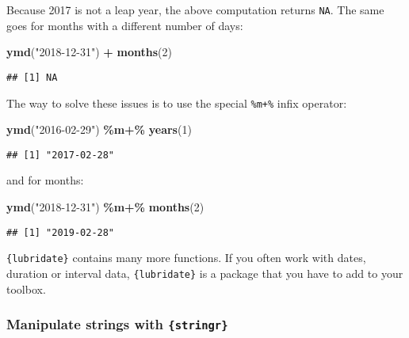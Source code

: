 \documentclass[
]{article}
\newenvironment{Shaded}{\begin{snugshade}}{\end{snugshade}}
\newcommand{\DecValTok}[1]{\textcolor[rgb]{0.00,0.00,0.81}{#1}}
\newcommand{\KeywordTok}[1]{\textcolor[rgb]{0.13,0.29,0.53}{\textbf{#1}}}
\newcommand{\NormalTok}[1]{#1}
\newcommand{\OperatorTok}[1]{\textcolor[rgb]{0.81,0.36,0.00}{\textbf{#1}}}
\newcommand{\StringTok}[1]{\textcolor[rgb]{0.31,0.60,0.02}{#1}}
\begin{document}
Because 2017 is not a leap year, the above computation returns \texttt{NA}. The same goes for months with
a different number of days:

\begin{Shaded}
\begin{Highlighting}[]
\KeywordTok{ymd}\NormalTok{(}\StringTok{"2018{-}12{-}31"}\NormalTok{) }\OperatorTok{+}\StringTok{ }\KeywordTok{months}\NormalTok{(}\DecValTok{2}\NormalTok{)}
\end{Highlighting}
\end{Shaded}

\begin{verbatim}
## [1] NA
\end{verbatim}

The way to solve these issues is to use the special \texttt{\%m+\%} infix operator:

\begin{Shaded}
\begin{Highlighting}[]
\KeywordTok{ymd}\NormalTok{(}\StringTok{"2016{-}02{-}29"}\NormalTok{) }\OperatorTok{\%m+\%}\StringTok{ }\KeywordTok{years}\NormalTok{(}\DecValTok{1}\NormalTok{)}
\end{Highlighting}
\end{Shaded}

\begin{verbatim}
## [1] "2017-02-28"
\end{verbatim}

and for months:

\begin{Shaded}
\begin{Highlighting}[]
\KeywordTok{ymd}\NormalTok{(}\StringTok{"2018{-}12{-}31"}\NormalTok{) }\OperatorTok{\%m+\%}\StringTok{ }\KeywordTok{months}\NormalTok{(}\DecValTok{2}\NormalTok{)}
\end{Highlighting}
\end{Shaded}

\begin{verbatim}
## [1] "2019-02-28"
\end{verbatim}

\texttt{\{lubridate\}} contains many more functions. If you often work with dates, duration or interval
data, \texttt{\{lubridate\}} is a package that you have to add to your toolbox.

\hypertarget{manipulate-strings-with-stringr}{%
\subsubsection{\texorpdfstring{Manipulate strings with \texttt{\{stringr\}}}{Manipulate strings with \{stringr\}}}\label{manipulate-strings-with-stringr}}
\end{document}
